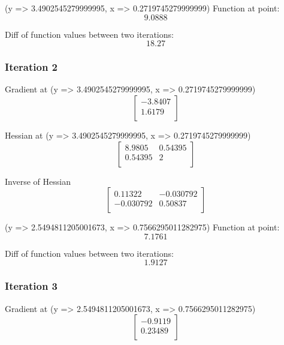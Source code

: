 \documentclass{article}
\begin{document}
(y => 3.4902545279999995, x => 0.2719745279999999)
Function at point:
\begin{equation}
9.0888
\end{equation}

Diff of function values between two iterations:
\begin{equation}
18.27
\end{equation}

\subsubsection{Iteration 2}
Gradient at (y => 3.4902545279999995, x => 0.2719745279999999)
\begin{equation}
\left[
\begin{array}{c}
-3.8407 \\
1.6179 \\
\end{array}
\right]
\end{equation}

Hessian at (y => 3.4902545279999995, x => 0.2719745279999999)
\begin{equation}
\left[
\begin{array}{cc}
8.9805 & 0.54395 \\
0.54395 & 2 \\
\end{array}
\right]
\end{equation}

Inverse of Hessian
\begin{equation}
\left[
\begin{array}{cc}
0.11322 & -0.030792 \\
-0.030792 & 0.50837 \\
\end{array}
\right]
\end{equation}

(y => 2.5494811205001673, x => 0.7566295011282975)
Function at point:
\begin{equation}
7.1761
\end{equation}

Diff of function values between two iterations:
\begin{equation}
1.9127
\end{equation}

\subsubsection{Iteration 3}
Gradient at (y => 2.5494811205001673, x => 0.7566295011282975)
\begin{equation}
\left[
\begin{array}{c}
-0.9119 \\
0.23489 \\
\end{array}
\right]
\end{equation}
\end{document}
